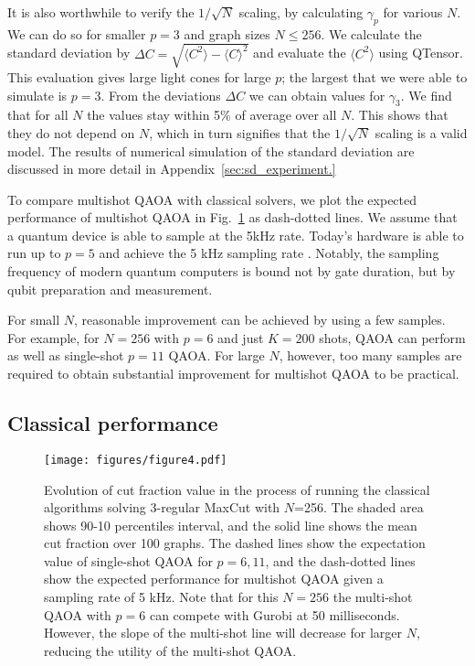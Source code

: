 \documentclass[prb,reprint,nofootinbib,longbibliography,superscriptaddress]{revtex4-1}
\begin{document}
It is also worthwhile to verify the $1/\sqrt N$ scaling,
by calculating $\gamma_p$ for various $N$. We can do so for smaller $p=3$ and graph sizes $N\leq256$.
We calculate the standard deviation by $\Delta C= \sqrt{\langle C^2 \rangle - \langle C \rangle ^2}$ and evaluate the $\langle C^2 \rangle$ using QTensor. This evaluation gives large light cones for large $p$;  the largest that we were able to simulate is $p=3$.
From the deviations $\Delta C$ we can obtain values for $\gamma_3$. We find that for all $N$ the values stay within 5\% of average over all $N$. This shows that they do not depend on $N$, which in turn signifies that the $1/\sqrt N$ scaling is a valid model. The results of numerical simulation of the standard deviation are discussed in more detail in Appendix~\ref{sec:sd_experiment.}


To compare multishot QAOA with classical solvers, we plot the expected performance of multishot QAOA in Fig.~\ref{fig:timebounds} as dash-dotted lines. We assume that a quantum device is able to sample at the 5kHz rate. Today's hardware is able to run up to $p=5$ and achieve the 5 kHz sampling rate \cite{Harrigan2021}.
Notably, the sampling frequency of modern quantum computers is bound not by gate duration, but by 
qubit preparation and measurement.

For small $N$, reasonable improvement can be achieved by using a few samples. For example, for $N=256$ with $p=6$ and just $K=200$ shots, QAOA can perform as well as single-shot $p=11$ QAOA. For large $N$, however, too many samples are required to obtain substantial improvement for multishot QAOA to be practical.



\subsection{Classical performance}\label{sec:classicalperformance}

\begin{figure}
    \centering
    \texttt{[image: figures/figure4.pdf]}
    \caption{
    Evolution of cut fraction value in the process of running the classical algorithms solving 3-regular MaxCut with $N$=256. The shaded area shows 90-10 percentiles interval, 
    and the solid line shows the mean cut fraction over 100 graphs.
    The dashed lines show the expectation value of single-shot QAOA for $p=6, 11$, and
    the dash-dotted lines show the expected performance for multishot QAOA given a sampling rate of 5 kHz.
    Note that for this $N=256$ the multi-shot QAOA with $p=6$ can compete with Gurobi
    at 50 milliseconds. However, the slope of the multi-shot line will decrease for larger $N$, reducing the utility of the multi-shot QAOA. 
    }
    \label{fig:timebounds}
\end{figure}
\end{document}
